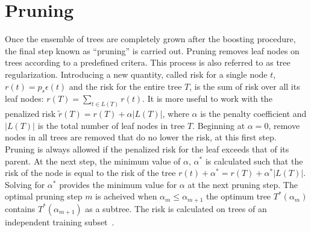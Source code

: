 \section{Pruning}
Once the ensemble of trees are completely grown after the boosting procedure, the final step known as ``pruning'' is carried out. Pruning removes leaf nodes on trees according
to a predefined critera. This process is also referred to as tree regularization. Introducing a new quantity, called risk for a single node $t$, $r(t) = p_{s}\epsilon(t)$
and the risk for the entire tree $T$, is the sum of risk over all its leaf nodes: $r(T) = \sum_{t \in L(T)} r(t)$. It is
more useful to work with the penalized risk $\widetilde{r}(T) = r(T) + \alpha|L(T)|$, where $\alpha$ is the penalty coefficient and $|L(T)|$ is the total number
of leaf nodes in tree $T$. Beginning at $\alpha = 0$, remove nodes in all trees are removed that do no lower the risk, at this first step. 
Pruning is always allowed if the penalized risk for the leaf exceeds that of its parent. At the next step, the minimum value of $\alpha$, $\alpha^{*}$ is calculated such that
the risk of the node is equal to the risk of the tree $r(t) + \alpha^{*} = r(T) + \alpha^{*}|L(T)|$. Solving for $\alpha^{*}$ provides the minimum value for $\alpha$
at the next pruning step. The optimal pruning step $m$ is acheived when $\alpha_{m} \le \alpha_{m+1}$ the optimum tree $T^{*}(\alpha_{m})$ contains $T^{*}(\alpha_{m+1})$
as a subtree. The risk is calculated on trees of an independent training subset~\cite{illya}. 


